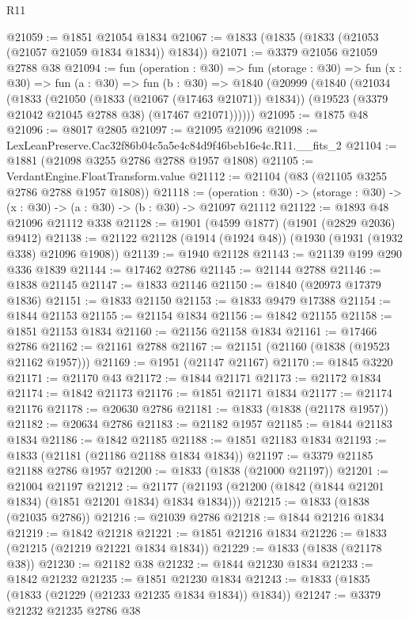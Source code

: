\begin{lexlean}{R11}
\begin{coremodule}
@21059 := @1851 @21054 @1834
@21067 := @1833 (@1835 (@1833 (@21053 (@21057 @21059 @1834 @1834)) @1834))
@21071 := @3379 @21056 @21059 @2788 @38
@21094 := fun (operation : @30) =>
  fun (storage : @30) =>
  fun (x : @30) =>
  fun (a : @30) =>
  fun (b : @30) =>
  @1840
    (@20999
      (@1840
        (@21034
          (@1833
            (@21050 (@1833 (@21067 (@17463 @21071)) @1834))
            (@19523 (@3379 @21042 @21045 @2788 @38) (@17467 @21071))))))
@21095 := @1875 @48
@21096 := @8017 @2805
@21097 := @21095 @21096
@21098 := LexLeanPreserve.Cac32f86b04c5a5e4c84d9f46beb16e4c.R11.__fits_2
@21104 := @1881 (@21098 @3255 @2786 @2788 @1957 @1808)
@21105 := VerdantEngine.FloatTransform.value
@21112 := @21104 (@83 (@21105 @3255 @2786 @2788 @1957 @1808))
@21118 := (operation : @30) ->
  (storage : @30) -> (x : @30) -> (a : @30) -> (b : @30) -> @21097 @21112
@21122 := @1893 @48 @21096 @21112 @338
@21128 := @1901 (@4599 @1877) (@1901 (@2829 @2036) @9412)
@21138 := @21122 @21128 (@1914 (@1924 @48)) (@1930 (@1931 (@1932 @338) @21096 @1908))
@21139 := @1940 @21128
@21143 := @21139 @199 @290 @336 @1839
@21144 := @17462 @2786
@21145 := @21144 @2788
@21146 := @1838 @21145
@21147 := @1833 @21146
@21150 := @1840 (@20973 @17379 @1836)
@21151 := @1833 @21150
@21153 := @1833 @9479 @17388
@21154 := @1844 @21153
@21155 := @21154 @1834
@21156 := @1842 @21155
@21158 := @1851 @21153 @1834
@21160 := @21156 @21158 @1834
@21161 := @17466 @2786
@21162 := @21161 @2788
@21167 := @21151 (@21160 (@1838 (@19523 @21162 @1957)))
@21169 := @1951 (@21147 @21167)
@21170 := @1845 @3220
@21171 := @21170 @43
@21172 := @1844 @21171
@21173 := @21172 @1834
@21174 := @1842 @21173
@21176 := @1851 @21171 @1834
@21177 := @21174 @21176
@21178 := @20630 @2786
@21181 := @1833 (@1838 (@21178 @1957))
@21182 := @20634 @2786
@21183 := @21182 @1957
@21185 := @1844 @21183 @1834
@21186 := @1842 @21185
@21188 := @1851 @21183 @1834
@21193 := @1833 (@21181 (@21186 @21188 @1834 @1834))
@21197 := @3379 @21185 @21188 @2786 @1957
@21200 := @1833 (@1838 (@21000 @21197))
@21201 := @21004 @21197
@21212 := @21177 (@21193 (@21200 (@1842 (@1844 @21201 @1834) (@1851 @21201 @1834) @1834 @1834)))
@21215 := @1833 (@1838 (@21035 @2786))
@21216 := @21039 @2786
@21218 := @1844 @21216 @1834
@21219 := @1842 @21218
@21221 := @1851 @21216 @1834
@21226 := @1833 (@21215 (@21219 @21221 @1834 @1834))
@21229 := @1833 (@1838 (@21178 @38))
@21230 := @21182 @38
@21232 := @1844 @21230 @1834
@21233 := @1842 @21232
@21235 := @1851 @21230 @1834
@21243 := @1833 (@1835 (@1833 (@21229 (@21233 @21235 @1834 @1834)) @1834))
@21247 := @3379 @21232 @21235 @2786 @38

\end{coremodule}
\end{lexlean}
